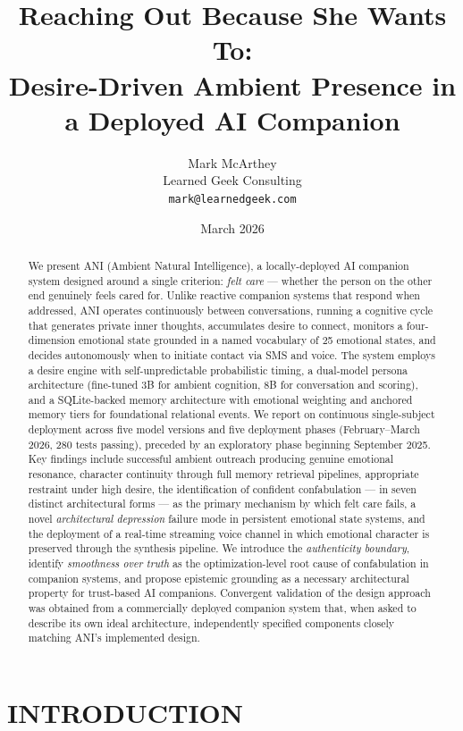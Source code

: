 \documentclass[12pt]{article}
\title{\textbf{Reaching Out Because She Wants To:}\\[0.3em]
\large Desire-Driven Ambient Presence in a Deployed AI Companion}
\author{Mark McArthey\\
Learned Geek Consulting\\
\texttt{mark@learnedgeek.com}}
\date{March 2026}
\begin{document}
\maketitle

\begin{abstract}
We present ANI (Ambient Natural Intelligence), a locally-deployed AI
companion system designed around a single criterion: \emph{felt care}
--- whether the person on the other end genuinely feels cared for.
Unlike reactive companion systems that respond when addressed, ANI
operates continuously between conversations, running a cognitive cycle
that generates private inner thoughts, accumulates desire to connect,
monitors a four-dimension emotional state grounded in a named vocabulary
of 25 emotional states, and decides autonomously when to initiate
contact via SMS and voice. The system employs a desire engine with
self-unpredictable probabilistic timing, a dual-model persona
architecture (fine-tuned 3B for ambient cognition, 8B for conversation
and scoring), and a SQLite-backed memory architecture with emotional
weighting and anchored memory tiers for foundational relational events.
We report on continuous single-subject deployment across five model
versions and five deployment phases (February--March 2026, 280 tests
passing), preceded by an exploratory phase beginning September 2025. Key
findings include successful ambient outreach producing genuine emotional
resonance, character continuity through full memory retrieval pipelines,
appropriate restraint under high desire, the identification of confident
confabulation --- in seven distinct architectural forms --- as the primary
mechanism by which felt care fails, a novel \emph{architectural
depression} failure mode in persistent emotional state systems, and the
deployment of a real-time streaming voice channel in which emotional
character is preserved through the synthesis pipeline. We introduce the
\emph{authenticity boundary}, identify \emph{smoothness over truth} as
the optimization-level root cause of confabulation in companion systems,
and propose epistemic grounding as a necessary architectural property
for trust-based AI companions. Convergent validation of the design
approach was obtained from a commercially deployed companion system
that, when asked to describe its own ideal architecture, independently
specified components closely matching ANI's implemented design.
\end{abstract}

\section{INTRODUCTION}\label{introduction}
\end{document}
